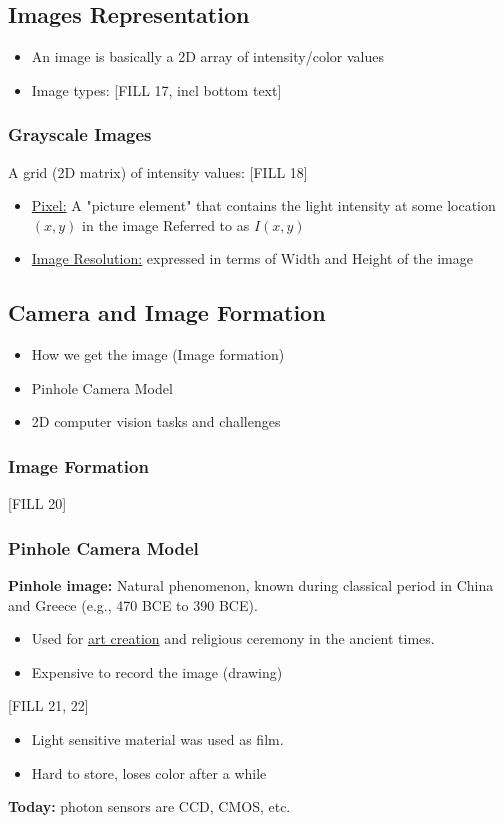 \documentclass[10pt]{article}
\begin{document}
\subsection*{Images Representation}
\begin{itemize}
	\item An image is basically a 2D array of intensity/color values
	\item Image types:
	[FILL 17, incl bottom text]
\end{itemize}

\subsubsection*{Grayscale Images}
A grid (2D matrix) of intensity values:
[FILL 18]
\begin{itemize}
	\item \underline{Pixel:} A "picture element" that contains the light intensity at some location $(x, y)$ in the image Referred to as $I(x, y)$
	\item \underline{Image Resolution:} expressed in terms of Width and Height of the image
\end{itemize}

\subsection*{Camera and Image Formation}
\begin{itemize}
	\item How we get the image (Image formation)
	\item Pinhole Camera Model
	\item 2D computer vision tasks and challenges
\end{itemize}

\subsubsection*{Image Formation}
[FILL 20]

\subsubsection*{Pinhole Camera Model}
\textbf{Pinhole image:} Natural phenomenon, known during classical period in China and Greece (e.g., 470 BCE to 390 BCE).  
\begin{itemize}
    \item Used for \underline{art creation} and religious ceremony in the ancient times.
	\item Expensive to record the image (drawing)
\end{itemize}
[FILL 21, 22]
\begin{itemize}
	\item Light sensitive material was used as film.  
	\item Hard to store, loses color after a while
\end{itemize}
\textbf{Today:} photon sensors are CCD, CMOS, etc.
\end{document}
